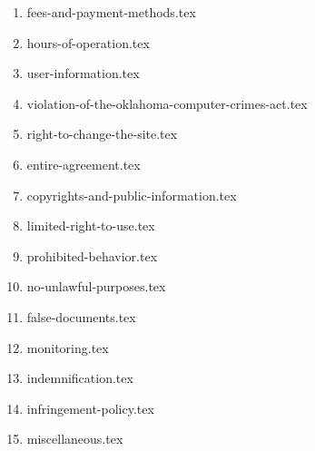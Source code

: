 \begin{enumerate}
    \item {fees-and-payment-methods.tex}
    \item {hours-of-operation.tex}
    \item {user-information.tex}
    \item {violation-of-the-oklahoma-computer-crimes-act.tex}
    \item {right-to-change-the-site.tex}
    \item {entire-agreement.tex}
    \item {copyrights-and-public-information.tex}
    \item {limited-right-to-use.tex}
    \item {prohibited-behavior.tex}
    \item {no-unlawful-purposes.tex}
    \item {false-documents.tex}
    \item {monitoring.tex}
    \item {indemnification.tex}
    \item {infringement-policy.tex}
    \item {miscellaneous.tex}
\end{enumerate}